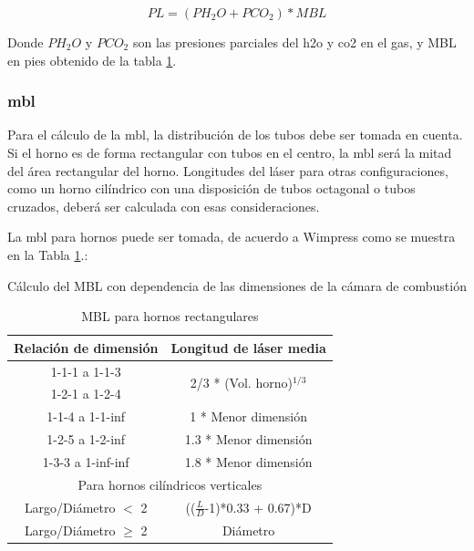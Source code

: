 \begin{equation}
\label{eq:pl}
PL = (PH_2O + PCO_2) * MBL
\end{equation}

\par Donde $PH_2O$ y $PCO_2$ son las presiones parciales del \ac{h2o} y \ac{co2} en el gas, y MBL en pies obtenido de la tabla \ref{tbl:mbl}.

\subsubsection{\ac{mbl}}
\par Para el cálculo de la \ac{mbl}, la distribución de los tubos debe ser tomada en cuenta. Si el horno es de forma rectangular con tubos en el centro, la \ac{mbl} será la mitad del área rectangular del horno. Longitudes del láser para otras configuraciones, como un horno cilíndrico con una disposición de tubos octagonal o tubos cruzados, deberá ser calculada con esas consideraciones.

\par La \ac{mbl} para hornos puede ser tomada, de acuerdo a Wimpress\cite{bib:wimpress} como se muestra en la Tabla \ref{tbl:mbl}.:

\begin{table}
\caption[Calculo del MBL]{Cálculo del MBL con dependencia de las dimensiones de la cámara de combustión}
\label{tbl:mbl}
    \centering
    \begin{tabular}{c|c}
        Relación de dimensión  & Longitud de láser media \\
        \hline
        1-1-1 a 1-1-3   & \multirow{2}{10em}{2/3 * (Vol. horno)$^{1/3}$} \\
        1-2-1 a 1-2-4   & \\
        \hline
        1-1-4 a 1-1-inf & 1 * Menor dimensión \\
        \hline
        1-2-5 a 1-2-inf   & 1.3 * Menor dimensión \\
        \hline
        1-3-3 a 1-inf-inf & 1.8 * Menor dimensión \\
        \hline
        \multicolumn{2}{c}{Para hornos cilíndricos verticales} \\
        \hline
        Largo/Diámetro $<$ 2  & (($\frac{L}{D}$-1)*0.33 + 0.67)*D\\
        \hline
        Largo/Diámetro $\geq$ 2 & Diámetro\\
    \end{tabular}
    \caption{MBL para hornos rectangulares}
    \label{tbl:mbl}
\end{table}


